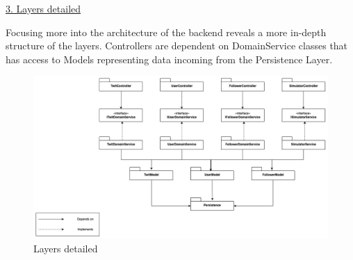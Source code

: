 \newpage
\underline{3. Layers detailed}
\vspace{3mm}

Focusing more into the architecture of the backend reveals a more in-depth structure of the layers. Controllers are dependent on DomainService classes that has access to Models representing data incoming from the Persistence Layer.

\begin{figure}[h!]
    \centering
    \includegraphics[width=\linewidth,height=\textheight,keepaspectratio]{images/architectural_views/minitwit_module_view_backend_layers_detailed.png}
    \caption{Layers detailed ~\cite{moduleViewLayersDetailed}}
    \label{fig:modulebackenddetail}
\end{figure}